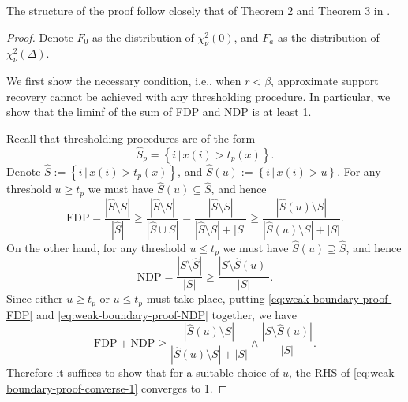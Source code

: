 The structure of the proof follow closely that of Theorem 2 and Theorem 3 in \citet{arias2017distribution}.

\begin{proof}
Denote $F_0$ as the distribution of $\chi^2_\nu(0)$, and $F_a$ as the distribution of $\chi^2_\nu(\Delta)$.

We first show the necessary condition, i.e., when $r<\beta$, approximate support recovery cannot be achieved with any thresholding procedure.
In particular, we show that the liminf of the sum of FDP and NDP is at least 1.

Recall that thresholding procedures are of the form
$$
\widehat{S}_p = \left\{i\,|\,x(i) > t_p(x)\right\}.
$$
Denote $\widehat{S} := \left\{i\,|\,x(i) > t_p(x)\right\}$, and $\widehat{S}(u) := \left\{i\,|\,x(i) > u\right\}$.
For any threshold $u\ge t_p$ we must have $\widehat{S}(u)\subseteq\widehat{S}$, and hence
\begin{equation} \label{eq:weak-boundary-proof-FDP}
    \text{FDP} = \frac{|\widehat{S}\setminus{S}|}{|\widehat{S}|} \ge \frac{|\widehat{S}\setminus{S}|}{|\widehat{S}\cup{S}|} = \frac{|\widehat{S}\setminus{S}|}{|\widehat{S}\setminus{S}| + |S|} \ge
    \frac{|\widehat{S}(u)\setminus{S}|}{|\widehat{S}(u)\setminus{S}| + |S|}.
\end{equation}
On the other hand, for any threshold $u\le t_p$ we must have $\widehat{S}(u)\supseteq\widehat{S}$, and hence
\begin{equation} \label{eq:weak-boundary-proof-NDP}
    \text{NDP} = \frac{|{S}\setminus\widehat{S}|}{|{S}|} \ge 
    \frac{|{S}\setminus\widehat{S}(u)|}{|{S}|}.
\end{equation}
Since either $u\ge t_p$ or  $u\le t_p$ must take place, putting \eqref{eq:weak-boundary-proof-FDP} and \eqref{eq:weak-boundary-proof-NDP} together, we have
\begin{equation} \label{eq:weak-boundary-proof-converse-1}
    \text{FDP} + \text{NDP} 
    \ge \frac{|\widehat{S}(u)\setminus{S}|}{|\widehat{S}(u)\setminus{S}|+|{S}|} \wedge \frac{|{S}\setminus\widehat{S}(u)|}{|{S}|}.
\end{equation}
Therefore it suffices to show that for a suitable choice of $u$, the RHS of \eqref{eq:weak-boundary-proof-converse-1} converges to 1.


\end{proof}
